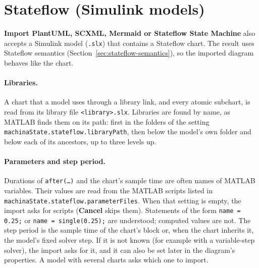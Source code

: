 \documentclass[11pt,a4paper,openany]{report}
\newcommand{\ui}[1]{\textsf{\textbf{#1}}}
\newcommand{\code}[1]{\texttt{#1}}
\begin{document}
\section{Stateflow (Simulink models)}
\label{sec:stateflow-import}
\ui{Import PlantUML, SCXML, Mermaid or Stateflow State Machine} also accepts a Simulink model
(\code{.slx}) that contains a Stateflow chart. The result uses Stateflow semantics
(Section~\ref{sec:stateflow-semantics}), so the imported diagram behaves like the chart.

\paragraph{Libraries.} A chart that a model uses through a library link, and every atomic subchart, is
read from its library file \code{<library>.slx}. Libraries are found by name, as MATLAB finds them on its
path: first in the folders of the setting \code{machinaState.stateflow.libraryPath}, then below the
model's own folder and below each of its ancestors, up to three levels up.

\paragraph{Parameters and step period.} Durations of \code{after(\dots)} and the chart's sample time are
often names of MATLAB variables. Their values are read from the MATLAB scripts listed in
\code{machinaState.stateflow.parameterFiles}. When that setting is empty, the import asks for scripts
(\ui{Cancel} skips them). Statements of the form \code{name = 0.25;} or \code{name = single(0.25);} are
understood; computed values are not. The step period is the sample time of the chart's block or, when the
chart inherits it, the model's fixed solver step. If it is not known (for example with a variable-step
solver), the import asks for it, and it can also be set later in the diagram's properties. A model with
several charts asks which one to import.
\end{document}
